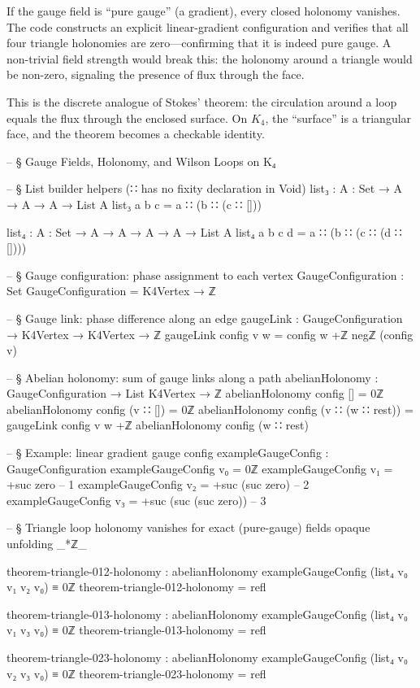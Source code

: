 \documentclass[11pt,a4paper]{book}
\begin{document}
If the gauge field is ``pure gauge'' (a gradient), every closed holonomy vanishes. The code constructs an explicit linear-gradient configuration and verifies that all four triangle holonomies are zero---confirming that it is indeed pure gauge. A non-trivial field strength would break this: the holonomy around a triangle would be non-zero, signaling the presence of flux through the face.

This is the discrete analogue of Stokes' theorem: the circulation around a loop equals the flux through the enclosed surface. On $K_4$, the ``surface'' is a triangular face, and the theorem becomes a checkable identity.

\begin{code}
-- § Gauge Fields, Holonomy, and Wilson Loops on K₄

-- § List builder helpers (∷ has no fixity declaration in Void)
list₃ : {A : Set} → A → A → A → List A
list₃ a b c = a ∷ (b ∷ (c ∷ []))

list₄ : {A : Set} → A → A → A → A → List A
list₄ a b c d = a ∷ (b ∷ (c ∷ (d ∷ [])))

-- § Gauge configuration: phase assignment to each vertex
GaugeConfiguration : Set
GaugeConfiguration = K4Vertex → ℤ

-- § Gauge link: phase difference along an edge
gaugeLink : GaugeConfiguration → K4Vertex → K4Vertex → ℤ
gaugeLink config v w = config w +ℤ negℤ (config v)

-- § Abelian holonomy: sum of gauge links along a path
abelianHolonomy : GaugeConfiguration → List K4Vertex → ℤ
abelianHolonomy config [] = 0ℤ
abelianHolonomy config (v ∷ []) = 0ℤ
abelianHolonomy config (v ∷ (w ∷ rest)) =
  gaugeLink config v w +ℤ abelianHolonomy config (w ∷ rest)

-- § Example: linear gradient gauge config
exampleGaugeConfig : GaugeConfiguration
exampleGaugeConfig v₀ = 0ℤ
exampleGaugeConfig v₁ = +suc zero      -- 1
exampleGaugeConfig v₂ = +suc (suc zero) -- 2
exampleGaugeConfig v₃ = +suc (suc (suc zero))  -- 3

-- § Triangle loop holonomy vanishes for exact (pure-gauge) fields
opaque
  unfolding _*ℤ_

  theorem-triangle-012-holonomy :
    abelianHolonomy exampleGaugeConfig (list₄ v₀ v₁ v₂ v₀) ≡ 0ℤ
  theorem-triangle-012-holonomy = refl

  theorem-triangle-013-holonomy :
    abelianHolonomy exampleGaugeConfig (list₄ v₀ v₁ v₃ v₀) ≡ 0ℤ
  theorem-triangle-013-holonomy = refl

  theorem-triangle-023-holonomy :
    abelianHolonomy exampleGaugeConfig (list₄ v₀ v₂ v₃ v₀) ≡ 0ℤ
  theorem-triangle-023-holonomy = refl


\end{code}
\end{document}
